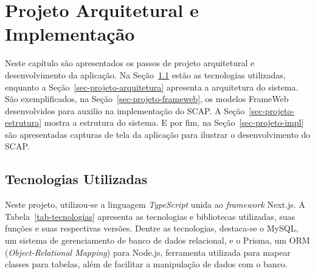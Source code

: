 \chapter{Projeto Arquitetural e Implementação}
\label{chap-projeto}

Neste capítulo
são apresentados os passos de projeto arquitetural e desenvolvimento da aplicação.
Na Seção~\ref{sec-projeto-tecnologias} estão as tecnologias utilizadas, enquanto a Seção~\ref{sec-projeto-arquitetura}
apresenta a arquitetura do sistema. São exemplificados, na Seção~\ref{sec-projeto-frameweb},
os modelos FrameWeb desenvolvidos para auxilio na implementação do SCAP. A Seção~\ref{sec-projeto-estrutura}
mostra a estrutura do sistema. E por fim, na Seção~\ref{sec-projeto-impl} são apresentadas capturas de
tela da aplicação para ilustrar o desenvolvimento do SCAP.



\section{Tecnologias Utilizadas}
\label{sec-projeto-tecnologias}


Neste projeto, utilizou-se a linguagem \textit{TypeScript} unida ao \textit{framework} Next.js.
A Tabela~\ref{tab-tecnologias} apresenta as tecnologias e bibliotecas utilizadas, suas funções e suas respectivas versões.
Dentre as tecnologias, destaca-se o MySQL, um sistema de gerenciamento de banco de dados relacional,
e o Prisma, um ORM (\textit{Object-Relational Mapping}) para Node.js, ferramenta utilizada
para mapear classes para tabelas, além de facilitar a manipulação de dados com o banco.

